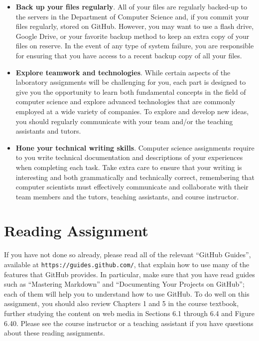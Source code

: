 \documentclass[11pt]{article}
\newcommand{\url}[1]{\lstinline{#1}}
\begin{document}
\begin{itemize}
\item {\bf Back up your files regularly}. All of your files are regularly backed-up to the servers in the Department of
  Computer Science and, if you commit your files regularly, stored on GitHub. However, you may want to use a flash
  drive, Google Drive, or your favorite backup method to keep an extra copy of your files on reserve. In the event of
  any type of system failure, you are responsible for ensuring that you have access to a recent backup copy of all your
  files.

\item {\bf Explore teamwork and technologies}. While certain aspects of the laboratory assignments will be challenging
  for you, each part is designed to give you the opportunity to learn both fundamental concepts in the field of computer
  science and explore advanced technologies that are commonly employed at a wide variety of companies. To explore and
  develop new ideas, you should regularly communicate with your team and/or the teaching assistants and tutors.

\item {\bf Hone your technical writing skills}. Computer science assignments require to you write technical
  documentation and descriptions of your experiences when completing each task. Take extra care to ensure that your
  writing is interesting and both grammatically and technically correct, remembering that computer scientists must
  effectively communicate and collaborate with their team members and the tutors, teaching assistants, and course
  instructor.


\end{itemize}

\section*{Reading Assignment}

If you have not done so already, please read all of the relevant ``GitHub
Guides'', available at \url{https://guides.github.com/}, that explain how to use
many of the features that GitHub provides. In particular, make sure that you
have read guides such as ``Mastering Markdown'' and ``Documenting Your Projects
on GitHub''; each of them will help you to understand how to use GitHub. To do
well on this assignment, you should also review Chapters 1 and 5 in the course
textbook, further studying the content on web media in Sections 6.1 through 6.4
and Figure 6.40. Please see the course instructor or a teaching assistant if you
have questions about these reading assignments.
\end{document}
